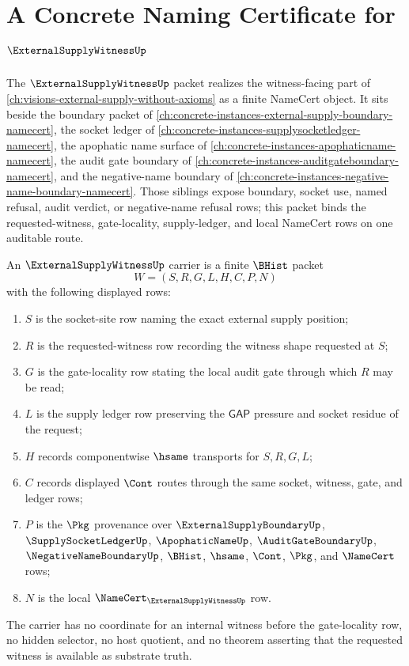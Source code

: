 \chapter{A Concrete Naming Certificate for $\ExternalSupplyWitnessUp$}
\label{ch:concrete-instances-external-supply-witness-namecert}

The $\ExternalSupplyWitnessUp$ packet realizes the witness-facing part of \autoref{ch:visions-external-supply-without-axioms} as a finite NameCert object. It sits beside the boundary packet of \autoref{ch:concrete-instances-external-supply-boundary-namecert}, the socket ledger of \autoref{ch:concrete-instances-supplysocketledger-namecert}, the apophatic name surface of \autoref{ch:concrete-instances-apophaticname-namecert}, the audit gate boundary of \autoref{ch:concrete-instances-auditgateboundary-namecert}, and the negative-name boundary of \autoref{ch:concrete-instances-negative-name-boundary-namecert}. Those siblings expose boundary, socket use, named refusal, audit verdict, or negative-name refusal rows; this packet binds the requested-witness, gate-locality, supply-ledger, and local NameCert rows on one auditable route.

\begin{definition}
\label{def:external-supply-witness-carrier}
An $\ExternalSupplyWitnessUp$ carrier is a finite $\BHist$ packet
$$
W=(S,R,G,L,H,C,P,N)
$$
with the following displayed rows:
\begin{enumerate}
\item $S$ is the socket-site row naming the exact external supply position;
\item $R$ is the requested-witness row recording the witness shape requested at $S$;
\item $G$ is the gate-locality row stating the local audit gate through which $R$ may be read;
\item $L$ is the supply ledger row preserving the $\mathsf{GAP}$ pressure and socket residue of the request;
\item $H$ records componentwise $\hsame$ transports for $S,R,G,L$;
\item $C$ records displayed $\Cont$ routes through the same socket, witness, gate, and ledger rows;
\item $P$ is the $\Pkg$ provenance over $\ExternalSupplyBoundaryUp$, $\SupplySocketLedgerUp$, $\ApophaticNameUp$, $\AuditGateBoundaryUp$, $\NegativeNameBoundaryUp$, $\BHist$, $\hsame$, $\Cont$, $\Pkg$, and $\NameCert$ rows;
\item $N$ is the local $\NameCert_{\ExternalSupplyWitnessUp}$ row.
\end{enumerate}
The carrier has no coordinate for an internal witness before the gate-locality row, no hidden selector, no host quotient, and no theorem asserting that the requested witness is available as substrate truth.
\end{definition}

